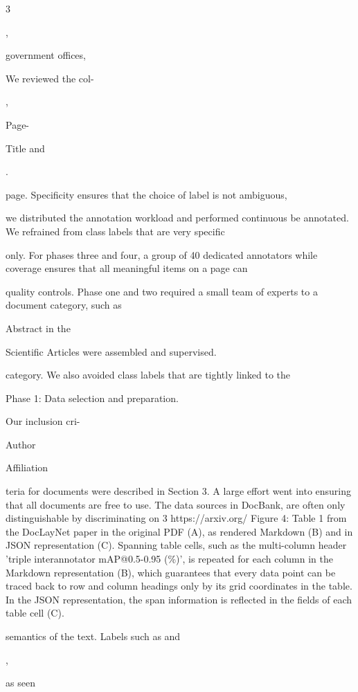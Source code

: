 \documentclass[11pt,a4paper]{article}
\begin{document}
3

,

government offices,

We reviewed the col-

,

Page-

Title and

.

page. Specificity ensures that the choice of label is not ambiguous,

\begin{figure}[h]
\end{figure}

we distributed the annotation workload and performed continuous be annotated. We refrained from class labels that are very specific

only. For phases three and four, a group of 40 dedicated annotators while coverage ensures that all meaningful items on a page can

quality controls. Phase one and two required a small team of experts to a document category, such as

Abstract in the

Scientific Articles were assembled and supervised.

category. We also avoided class labels that are tightly linked to the

Phase 1: Data selection and preparation.

Our inclusion cri-

Author

Affiliation

teria for documents were described in Section 3. A large effort went into ensuring that all documents are free to use. The data sources in DocBank, are often only distinguishable by discriminating on 3 https://arxiv.org/ Figure 4: Table 1 from the DocLayNet paper in the original PDF (A), as rendered Markdown (B) and in JSON representation (C). Spanning table cells, such as the multi-column header 'triple interannotator mAP@0.5-0.95 (\%)', is repeated for each column in the Markdown representation (B), which guarantees that every data point can be traced back to row and column headings only by its grid coordinates in the table. In the JSON representation, the span information is reflected in the fields of each table cell (C).

semantics of the text. Labels such as and

,

as seen
\end{document}
